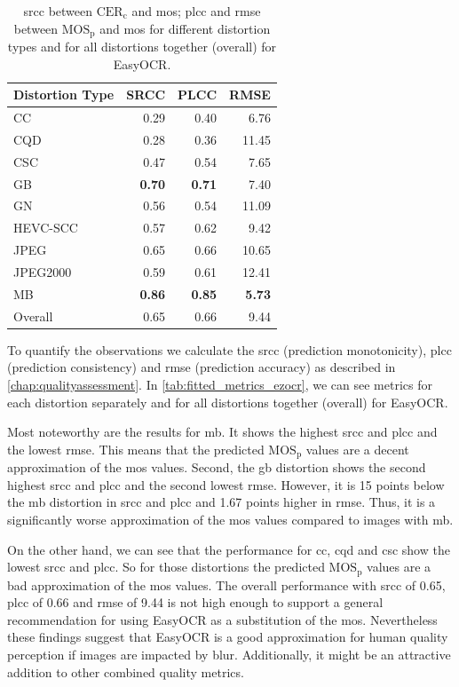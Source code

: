 \begin{table}[h!]
    \centering
    \begin{tabular}{|l|rrr|}
        \hline
        Distortion Type & SRCC & PLCC & RMSE \\
        \hline
        \hline
        CC & 0.29 & 0.40 & 6.76 \\
        CQD & 0.28 & 0.36 & 11.45 \\
        CSC & 0.47 & 0.54 & 7.65 \\
        GB & \textbf{0.70} & \textbf{0.71} & 7.40 \\
        GN & 0.56 & 0.54 & 11.09 \\
        HEVC-SCC & 0.57 & 0.62 & 9.42 \\
        JPEG & 0.65 & 0.66 & 10.65 \\
        JPEG2000 & 0.59 & 0.61 & 12.41 \\
        MB & \textbf{0.86} & \textbf{0.85} & \textbf{5.73} \\
        \hline
        Overall & 0.65 & 0.66 & 9.44 \\
        \hline
    \end{tabular}
    \caption{\gls{srcc} between $\text{CER}_{\text{c}}$ and \gls{mos}; \gls{plcc} and \gls{rmse} between $\text{MOS}_{\text{p}}$ and \gls{mos} for different distortion types and for all distortions together (overall) for EasyOCR.}
    \label{tab:fitted_metrics_ezocr}
\end{table}

To quantify the observations we calculate the \gls{srcc} (prediction monotonicity), \gls{plcc} (prediction consistency) and \gls{rmse} (prediction accuracy) as described in \autoref{chap:qualityassessment}.
In \autoref{tab:fitted_metrics_ezocr}, we can see metrics for each distortion separately and for all distortions together (overall) for EasyOCR.

Most noteworthy are the results for \gls{mb}.
It shows the highest \gls{srcc} and \gls{plcc} and the lowest \gls{rmse}.
This means that the predicted $\text{MOS}_{\text{p}}$ values are a decent approximation of the \gls{mos} values.
Second, the \gls{gb} distortion shows the second highest \gls{srcc} and \gls{plcc} and the second lowest \gls{rmse}.
However, it is 15 points below the \gls{mb} distortion in \gls{srcc} and \gls{plcc} and 1.67 points higher in \gls{rmse}.
Thus, it is a significantly worse approximation of the \gls{mos} values compared to images with \gls{mb}.

On the other hand, we can see that the performance for \gls{cc}, \gls{cqd} and \gls{csc} show the lowest \gls{srcc} and \gls{plcc}.
So for those distortions the predicted $\text{MOS}_{\text{p}}$ values are a bad approximation of the \gls{mos} values.
The overall performance with \gls{srcc} of 0.65, \gls{plcc} of 0.66 and \gls{rmse} of 9.44 is not high enough to support a general recommendation for using EasyOCR as a substitution of the \gls{mos}.
Nevertheless these findings suggest that EasyOCR is a good approximation for human quality perception if images are impacted by blur.
Additionally, it might be an attractive addition to other combined quality metrics.

